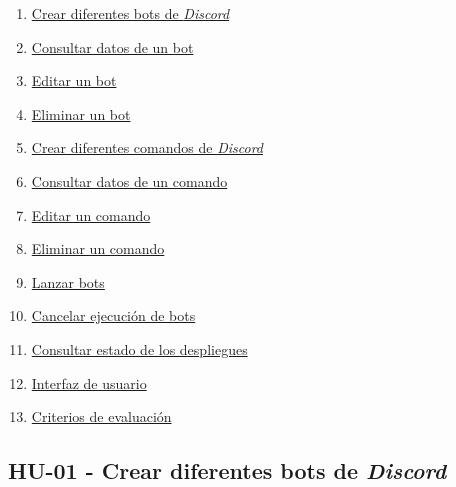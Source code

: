 \begin{enumerate}
	\item \href{https://github.com/harvestcore/matroos/issues/1}{Crear diferentes bots de \textit{Discord}}
	\item \href{https://github.com/harvestcore/matroos/issues/2}{Consultar datos de un bot}
	\item \href{https://github.com/harvestcore/matroos/issues/3}{Editar un bot}
	\item \href{https://github.com/harvestcore/matroos/issues/4}{Eliminar un bot}
	\item \href{https://github.com/harvestcore/matroos/issues/5}{Crear diferentes comandos de \textit{Discord}}
	\item \href{https://github.com/harvestcore/matroos/issues/6}{Consultar datos de un comando}
	\item \href{https://github.com/harvestcore/matroos/issues/7}{Editar un comando}
	\item \href{https://github.com/harvestcore/matroos/issues/8}{Eliminar un comando}
	\item \href{https://github.com/harvestcore/matroos/issues/9}{Lanzar bots}
	\item \href{https://github.com/harvestcore/matroos/issues/10}{Cancelar ejecución de bots}
	\item \href{https://github.com/harvestcore/matroos/issues/11}{Consultar estado de los despliegues}
	\item \href{https://github.com/harvestcore/matroos/issues/25}{Interfaz de usuario}
	\item \href{https://github.com/harvestcore/matroos/issues/39}{Criterios de evaluación}
\end{enumerate}


\subsection{HU-01 - Crear diferentes bots de \textit{Discord}}
\label{sec:hu01}

